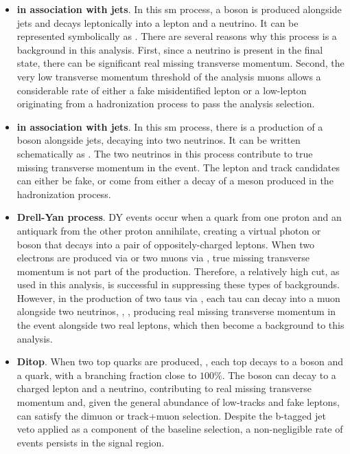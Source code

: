 \begin{itemize}
\item \textbf{\PW in association with jets}. In this \gls{sm} process, a \PW boson is produced alongside jets and decays leptonically into a lepton and a neutrino. It can be represented symbolically as \wjets. There are several reasons why this process is a background in this analysis. First, since a neutrino is present in the final state, there can be significant real missing transverse momentum. Second, the very low transverse momentum \pt threshold of the analysis muons allows a considerable rate of either a fake misidentified lepton or a low-\pt lepton originating from a hadronization process to pass the analysis selection.

\item \textbf{\PZ in association with jets}. In this \gls{sm} process, there is a production of a \PZ boson alongside jets, decaying into two neutrinos. It can be written schematically as \mbox{\zjets}. The two neutrinos in this process contribute to true missing transverse momentum in the event. The lepton and track candidates can either be fake, or come from either a decay of a meson produced in the hadronization process.

\item \textbf{Drell-Yan process}. DY events occur when a quark from one proton and an antiquark from the other proton annihilate, creating a virtual photon or \PZ boson that decays into a pair of oppositely-charged leptons. When two electrons are produced via \zee or two muons via \zmm, true missing transverse momentum is not part of the production. Therefore, a relatively high \MET cut, as used in this analysis, is successful in suppressing these types of backgrounds. However, in the production of two taus via \ztautau, each tau can decay into a muon alongside two neutrinos, \ie, \tautomu, producing real missing transverse momentum in the event alongside two real leptons, which then become a background to this analysis.

\item \textbf{Ditop}. When two top quarks are produced, \ttbar, each top decays to a \PW boson and a \PQb quark, with a branching fraction close to $100\%$. The \PW boson can decay to a charged lepton and a neutrino, contributing to real missing transverse momentum and, given the general abundance of low-\pt tracks and fake leptons, can satisfy the dimuon or track+muon selection. Despite the b-tagged jet veto applied as a component of the baseline selection, a non-negligible rate of \ttbar events persists in the signal region. 


\end{itemize}
